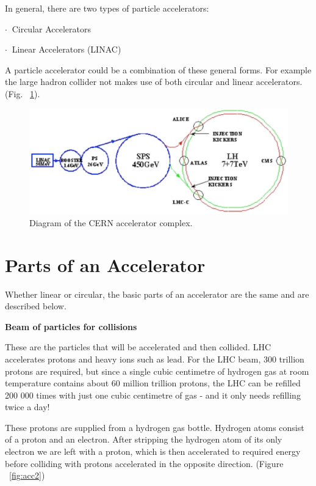\;

In general, there are two types of particle accelerators: 

\;

          $ \cdot \:$  Circular Accelerators

	  $ \cdot \:$  Linear Accelerators (LINAC)

\;
\noindent
A particle accelerator could be a combination of these general forms. For example the large hadron collider not makes use of both circular and linear accelerators. (Fig. ~\ref{fig:acc1}).

\;
\;

\begin{figure}[h]
\centering\includegraphics[scale=0.5]{./Particleaccelerators/Pictures/fig1.pdf}
\caption{Diagram of the CERN accelerator complex.}
\label{fig:acc1}
\end{figure}

\section{Parts of an Accelerator}

Whether linear or circular, the basic parts of an accelerator are the same and are described below.

\;
\;
\;

\noindent
\textbf{Beam of particles for collisions}

\;
\;

\noindent
These are the particles that will be accelerated and then collided. LHC accelerates protons and heavy ions such as lead. For the LHC beam, 300 trillion protons are required, but since a single cubic centimetre of hydrogen gas at room temperature contains about 60 million trillion protons, the LHC can be refilled 200 000 times with just one cubic centimetre of gas - and it only needs refilling twice a day!

\;
\noindent
These protons are supplied from a hydrogen gas bottle. Hydrogen atoms consist of a proton and an electron. After stripping the hydrogen atom of its only electron we are left with a proton, which is then accelerated to required energy before colliding with protons accelerated in the opposite direction. (Figure ~\ref{fig:acc2})


